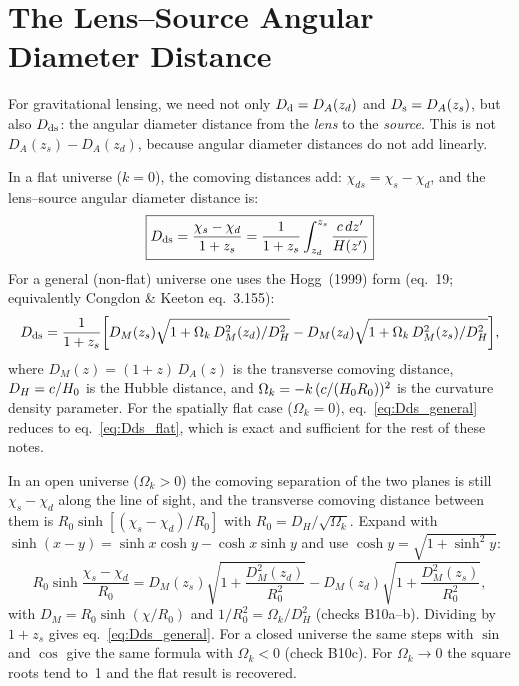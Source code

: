 \section{The Lens--Source Angular Diameter Distance}
\label{sec:Dds}

For gravitational lensing, we need not only $D_{\mathrm{d}} = D_A(z_d)$ and
$D_{\mathrm{s}} = D_A(z_s)$, but also $D_{\mathrm{ds}}$: the angular diameter distance from
the \textit{lens} to the \textit{source}.  This is not
$D_A(z_s) - D_A(z_d)$, because angular diameter distances do not add
linearly.

In a flat universe ($k = 0$), the comoving distances add:
$\chi_{ds} = \chi_s - \chi_d$, and the lens--source angular diameter
distance is:
\begin{equation}
    \boxed{
    D_{\mathrm{ds}} = \frac{\chi_s - \chi_d}{1 + z_s}
    = \frac{1}{1+z_s}\int_{z_d}^{z_s}
    \frac{c\, dz'}{H(z')}
    }
    \label{eq:Dds_flat}
\end{equation}
For a general (non-flat) universe one uses the Hogg~(1999) form
(eq.~19; equivalently Congdon \& Keeton eq.~3.155):
\begin{equation}
    D_{\mathrm{ds}} = \frac{1}{1+z_s}\!\left[
    D_M(z_s)\sqrt{1 + \Omega_k\,D_M^2(z_d)/D_H^2}
    - D_M(z_d)\sqrt{1 + \Omega_k\,D_M^2(z_s)/D_H^2}
    \right]\!,
    \label{eq:Dds_general}
\end{equation}
where $D_M(z) = (1+z)\,D_A(z)$ is the transverse comoving distance,
$D_H = c/H_0$ is the Hubble distance, and
$\Omega_k = -k\,(c/(H_0 R_0))^2$ is the curvature density
parameter.  For the spatially flat case ($\Omega_k = 0$),
eq.~\eqref{eq:Dds_general} reduces to eq.~\eqref{eq:Dds_flat}, which is
exact and sufficient for the rest of these notes.


\begin{derivation}
In an open universe ($\Omega_k > 0$) the comoving separation of the two planes is
still $\chi_s - \chi_d$ along the line of sight, and the transverse comoving
distance between them is $R_0\sinh[(\chi_s-\chi_d)/R_0]$ with
$R_0 = D_H/\sqrt{\Omega_k}$.  Expand with
$\sinh(x-y) = \sinh x\cosh y - \cosh x\sinh y$ and use
$\cosh y = \sqrt{1 + \sinh^2 y}$:
\[
  R_0\sinh\frac{\chi_s-\chi_d}{R_0}
  = D_M(z_s)\sqrt{1 + \frac{D_M^2(z_d)}{R_0^2}} - D_M(z_d)\sqrt{1 + \frac{D_M^2(z_s)}{R_0^2}},
\]
with $D_M = R_0\sinh(\chi/R_0)$ and $1/R_0^2 = \Omega_k/D_H^2$ (checks
B10a--b).  Dividing by $1+z_s$ gives eq.~\eqref{eq:Dds_general}.  For a closed
universe the same steps with $\sin$ and $\cos$ give the same formula with
$\Omega_k < 0$ (check B10c).  For $\Omega_k \to 0$ the square roots tend to~1
and the flat result is recovered.
\end{derivation}

